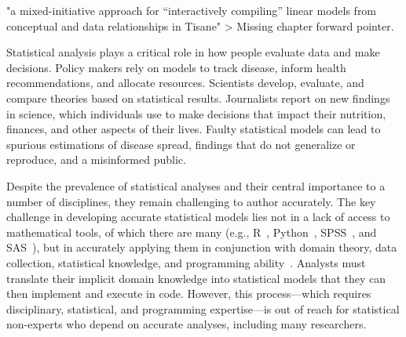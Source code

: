 "a mixed-initiative approach for “interactively compiling” linear models from conceptual and data relationships in Tisane"
> Missing chapter forward pointer.






Statistical analysis plays a critical role in how people evaluate data and make
decisions. Policy makers rely on models to track disease, inform health
recommendations, and allocate resources. Scientists develop, evaluate, and
compare theories based on statistical results. Journalists report on new
findings in science, which individuals use to make decisions that impact their
nutrition, finances, and other aspects of their lives. Faulty statistical models can lead to spurious estimations of disease spread,
findings that do not generalize or reproduce, and a misinformed public. 

Despite the prevalence of statistical analyses and their central importance to a
number of disciplines, they remain challenging to author accurately. The key
challenge in developing accurate statistical models lies not in a lack of access
to mathematical tools, of which there are many (e.g., R~\cite{team2013r},
Python~\cite{sanner1999python}, SPSS~\cite{spss}, and SAS~\cite{sas}), but in
accurately applying them in conjunction with domain theory, data collection,
statistical knowledge, and programming ability~\cite{mcelreath2020statistical}.
Analysts must translate their implicit domain knowledge into statistical models
that they can then implement and execute in code. However, this process---which
requires disciplinary, statistical, and programming expertise---is out of reach
for statistical non-experts who depend on accurate analyses, including many
researchers. 


